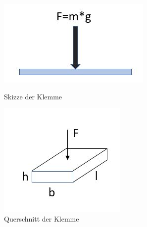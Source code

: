 \begin{figure}[H]
   \begin{minipage}[hbt]{.4\linewidth} %
      \includegraphics[width=\linewidth]{Bilder/Powerpoint/Flaechenkraft}
      \caption{Skizze der Klemme}
      \label{SkizzeKlemme} 
   \end{minipage}
   \hspace{.2\linewidth}%
   \begin{minipage}[hbt]{.3\linewidth} %
      \includegraphics[width=\linewidth]{Bilder/Powerpoint/IBerechnung}
      \caption{Querschnitt der Klemme}
      \label{I_Skizze}
   \end{minipage}
\end{figure}

